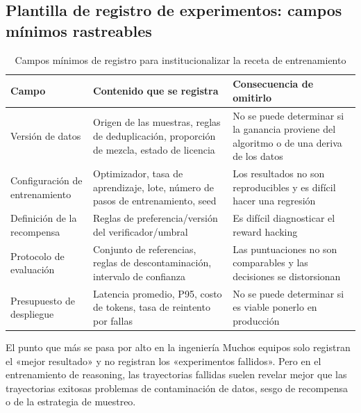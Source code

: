 \documentclass[a4paper]{article}
\begin{document}
\subsection{Plantilla de registro de experimentos: campos mínimos rastreables}
\begin{table}[H]
\centering
\renewcommand{\arraystretch}{1.2}
\begin{tabular}{p{3.0cm}p{3.7cm}p{4.1cm}}
\toprule
\textbf{Campo} & \textbf{Contenido que se registra} & \textbf{Consecuencia de omitirlo} \\
\midrule
Versión de datos & Origen de las muestras, reglas de deduplicación, proporción de mezcla, estado de licencia & No se puede determinar si la ganancia proviene del algoritmo o de una deriva de los datos \\
Configuración de entrenamiento & Optimizador, tasa de aprendizaje, lote, número de pasos de entrenamiento, seed & Los resultados no son reproducibles y es difícil hacer una regresión \\
Definición de la recompensa & Reglas de preferencia/versión del verificador/umbral & Es difícil diagnosticar el reward hacking \\
Protocolo de evaluación & Conjunto de referencias, reglas de descontaminación, intervalo de confianza & Las puntuaciones no son comparables y las decisiones se distorsionan \\
Presupuesto de despliegue & Latencia promedio, P95, costo de tokens, tasa de reintento por fallas & No se puede determinar si es viable ponerlo en producción \\
\bottomrule
\end{tabular}
\caption{Campos mínimos de registro para institucionalizar la receta de entrenamiento}
\end{table}

\begin{knowledgebox}{El punto que más se pasa por alto en la ingeniería}
Muchos equipos solo registran el «mejor resultado» y no registran los «experimentos fallidos». Pero en el entrenamiento de reasoning, las trayectorias fallidas suelen revelar mejor que las trayectorias exitosas problemas de contaminación de datos, sesgo de recompensa o de la estrategia de muestreo.
\end{knowledgebox}
\end{document}
